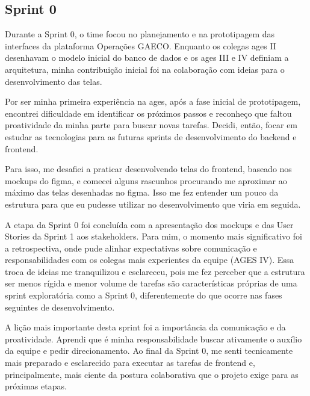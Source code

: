 \subsection{Sprint 0}

Durante a Sprint 0, o time focou no planejamento e na prototipagem das interfaces da plataforma Operações GAECO. Enquanto os colegas \ac{ages} II desenhavam o modelo inicial do banco de dados e os \ac{ages} III e IV definiam a arquitetura, minha contribuição inicial foi na colaboração com ideias para o desenvolvimento das telas.

Por ser minha primeira experiência na \ac{ages}, após a fase inicial de prototipagem, encontrei dificuldade em identificar os próximos passos e reconheço que faltou proatividade da minha parte para buscar novas tarefas. Decidi, então, focar em estudar as tecnologias para as futuras sprints de desenvolvimento do backend e frontend.

Para isso, me desafiei a praticar desenvolvendo telas do frontend, baseado nos mockups do figma, e comecei alguns rascunhos procurando me aproximar ao máximo das telas desenhadas no figma. Isso me fez entender um pouco da estrutura para que eu pudesse utilizar no desenvolvimento que viria em seguida.

A etapa da Sprint 0 foi concluída com a apresentação dos mockups e das User Stories da Sprint 1 aos stakeholders. Para mim, o momento mais significativo foi a retrospectiva, onde pude alinhar expectativas sobre comunicação e responsabilidades com os colegas mais experientes da equipe (AGES IV). Essa troca de ideias me tranquilizou e esclareceu, pois me fez perceber que a estrutura ser menos rígida e menor volume de tarefas são características próprias de uma sprint exploratória como a Sprint 0, diferentemente do que ocorre nas fases seguintes de desenvolvimento.

A lição mais importante desta sprint foi a importância da comunicação e da proatividade. Aprendi que é minha responsabilidade buscar ativamente o auxílio da equipe e pedir direcionamento. Ao final da Sprint 0, me senti tecnicamente mais preparado e esclarecido para executar as tarefas de frontend e, principalmente, mais ciente da postura colaborativa que o projeto exige para as próximas etapas.